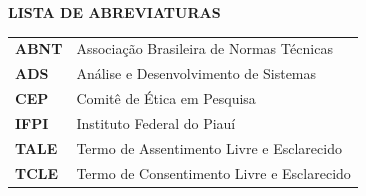 \newpage
\begin{center}
    \textbf{LISTA DE ABREVIATURAS}
\end{center}
\thispagestyle{empty} %

\noindent
\begin{tabular}{@{}ll@{}}
    \textbf{ABNT} & Associação Brasileira de Normas Técnicas \\
    \textbf{ADS}  & Análise e Desenvolvimento de Sistemas \\
    \textbf{CEP}  & Comitê de Ética em Pesquisa \\
    \textbf{IFPI} & Instituto Federal do Piauí \\
    \textbf{TALE} & Termo de Assentimento Livre e Esclarecido \\
    \textbf{TCLE} & Termo de Consentimento Livre e Esclarecido \\
\end{tabular}